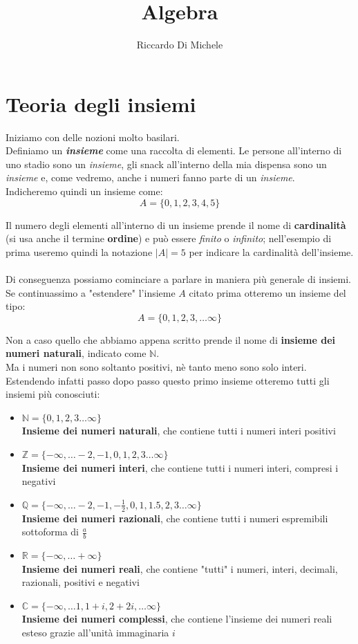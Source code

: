 \documentclass[11pt]{article}
\title{Algebra}
\author{Riccardo Di Michele}
\date{}
\begin{document}
\maketitle

\section{Teoria degli insiemi}
Iniziamo con delle nozioni molto basilari. \\
Definiamo un \emph{\textbf{insieme}} come una raccolta di elementi. Le persone all'interno
di uno stadio sono un \emph{insieme}, gli snack all'interno della mia dispensa sono un
\emph{insieme} e, come vedremo, anche i numeri fanno parte di un \emph{insieme}. \\
Indicheremo quindi un insieme come: 
\[
  A = \{0, 1, 2, 3, 4, 5 \}
\]

Il numero degli elementi all'interno di un insieme prende il nome di \textbf{cardinalità}
(si usa anche il termine \textbf{ordine}) e può essere \emph{finito} o \emph{infinito}; nell'esempio di prima useremo quindi la
notazione \(|A| = 5\) per indicare la cardinalità dell'insieme.
\\
\\
Di conseguenza possiamo cominciare a parlare in maniera più generale di insiemi.
Se continuassimo a "estendere" l'insieme \(A\) citato prima otteremo un insieme
del tipo: 
\[
  A = \{0, 1, 2, 3, \dots \infty \}
\]

Non a caso quello che abbiamo appena scritto prende il nome di 
\textbf{insieme dei numeri naturali}, indicato come \( \mathbb{N} \). \\
Ma i numeri non sono soltanto positivi, nè tanto meno sono solo interi.
Estendendo infatti passo dopo passo questo primo insieme otteremo tutti gli 
insiemi più conosciuti:

\begin{itemize}
  \item \( \mathbb{N} = \{0, 1, 2, 3 \dots \infty \} \) \\ 
  \textbf{Insieme dei numeri naturali},
  che contiene tutti i numeri interi positivi
  \item \( \mathbb{Z} = \{ -\infty, \dots -2, -1, 0, 1, 2, 3 \dots \infty \} \) \\ 
  \textbf{Insieme dei numeri interi},
  che contiene tutti i numeri interi, compresi i negativi
  \item \( \mathbb{Q} = \{ -\infty, \dots -2, -1, -\frac{1}{2}, 0, 1, 1.5, 2, 3 \dots \infty \} \) \\ 
  \textbf{Insieme dei numeri razionali},
  che contiene tutti i numeri espremibili sottoforma di \( \frac{a}{b} \)
  \item \(\mathbb{R} = \{ -\infty, \dots + \infty\}\) \\
  \textbf{Insieme dei numeri reali},
  che contiene "tutti" i numeri, interi, decimali, razionali, positivi e negativi
  \item \( \mathbb{C} = \{ -\infty, \dots 1, 1 +i, 2 +2i, \dots \infty \} \) \\
  \textbf{Insieme dei numeri complessi},
  che contiene l'insieme dei numeri reali esteso grazie all'unità immaginaria \(i\)
\end{itemize}
\end{document}
